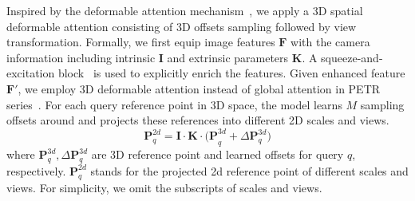 \documentclass[letterpaper]{article} \usepackage{aaai24}
\begin{document}
Inspired by the deformable attention mechanism~\cite{zhu2020deformable}, we apply a 3D spatial deformable attention consisting of 3D offsets sampling followed by view transformation. Formally, we first equip image features $\mathbf{F}$ with the camera information including intrinsic $\mathbf{I}$ and extrinsic parameters $\mathbf{K}$.
A squeeze-and-excitation block~\cite{hu2018squeeze} is used to explicitly enrich the features. 
Given enhanced feature $\mathbf{F'}$, we employ 3D deformable attention instead of global attention in PETR series~\cite{liu2022petr, liu2022petrv2, wang2023exploring}. For each query reference point in 3D space, the model learns $M$ sampling offsets around and projects these references into different 2D scales and views.
\begin{equation} \label{eq:p_2d}
    \mathbf{P}_q^{2d} = \mathbf{I\cdot K \cdot (P}_q^{3d} + \Delta \mathbf{P}_q^{3d})
\end{equation}
where $\mathbf{P}_q^{3d}, \Delta\mathbf{P}_q^{3d}$ are 3D reference point and learned offsets for query $q$, respectively. $\mathbf{P}_q^{2d}$ stands for the projected 2d reference point of different scales and views. For simplicity, we omit the subscripts of scales and views.
\end{document}
